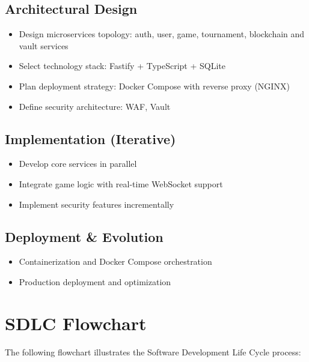 \documentclass[11pt,a4paper]{report}
\begin{document}
\subsection{Architectural Design}
\begin{itemize}
  \item Design microservices topology: auth, user, game, tournament, blockchain and vault services
  \item Select technology stack: Fastify + TypeScript + SQLite
  \item Plan deployment strategy: Docker Compose with reverse proxy (NGINX)
  \item Define security architecture: WAF, Vault
\end{itemize}

\subsection{Implementation (Iterative)}
\begin{itemize}
  \item Develop core services in parallel
  \item Integrate game logic with real-time WebSocket support
  \item Implement security features incrementally
\end{itemize}

\subsection{Deployment \& Evolution}
\begin{itemize}
  \item Containerization and Docker Compose orchestration
  \item Production deployment and optimization
\end{itemize}

\section{SDLC Flowchart}
\label{sec:sdlc_flowchart}

The following flowchart illustrates the Software Development Life Cycle process:

\vspace{1cm}
\end{document}
